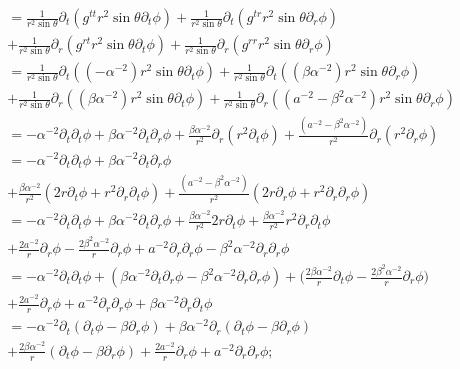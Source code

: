 \documentclass[12pt]{article}
\numberwithin{equation}{section}
\begin{document}
\begin{equation*}
\begin{aligned}
&= \frac{1}{r^2 \sin \theta} \partial_t (g^{t t} r^2 \sin \theta \partial_t \phi) + \frac{1}{r^2 \sin \theta} \partial_t (g^{t r} r^2 \sin \theta \partial_r \phi) \\
&+ \frac{1}{r^2 \sin \theta} \partial_r (g^{r t} r^2 \sin \theta \partial_t \phi) + \frac{1}{r^2 \sin \theta} \partial_r (g^{r r} r^2 \sin \theta \partial_r \phi)\\
&= \frac{1}{r^2 \sin \theta} \partial_t ( (-\alpha^{-2}) r^2 \sin \theta \partial_t \phi) + \frac{1}{r^2 \sin \theta} \partial_t ( (\beta \alpha^{-2}) r^2 \sin \theta \partial_r \phi) \\
&+ \frac{1}{r^2 \sin \theta} \partial_r ( (\beta \alpha^{-2}) r^2 \sin \theta \partial_t \phi) + \frac{1}{r^2 \sin \theta} \partial_r ( (a^{-2} - \beta^2 \alpha^{-2}) r^2 \sin \theta \partial_r \phi)\\
&= -\alpha^{-2} \partial_t \partial_t \phi + \beta \alpha^{-2} \partial_t  \partial_r \phi + \frac{\beta \alpha^{-2}}{r^2} \partial_r ( r^2 \partial_t \phi) + \frac{(a^{-2} - \beta^2 \alpha^{-2})}{r^2} \partial_r (r^2 \partial_r \phi)\\
&= -\alpha^{-2} \partial_t \partial_t \phi + \beta \alpha^{-2} \partial_t  \partial_r \phi \\
&+ \frac{\beta \alpha^{-2}}{r^2} (2 r \partial_t \phi + r^2 \partial_r \partial_t \phi) + \frac{(a^{-2} - \beta^2 \alpha^{-2})}{r^2} (2 r \partial_r \phi + r^2 \partial_r \partial_r \phi)\\
&= -\alpha^{-2} \partial_t \partial_t \phi + \beta \alpha^{-2} \partial_t  \partial_r \phi + \frac{\beta \alpha^{-2}}{r^2} 2 r \partial_t \phi + \frac{\beta \alpha^{-2}}{r^2} r^2 \partial_r \partial_t \phi \\
&+ \frac{2a^{-2}}{r} \partial_r \phi - \frac{2\beta^2 \alpha^{-2}}{r} \partial_r \phi + a^{-2} \partial_r \partial_r \phi - \beta^2 \alpha^{-2} \partial_r \partial_r \phi \\
&= -\alpha^{-2} \partial_t \partial_t \phi + (\beta \alpha^{-2} \partial_t  \partial_r \phi - \beta^2 \alpha^{-2} \partial_r \partial_r \phi) + \Big( \frac{2 \beta \alpha^{-2}}{r} \partial_t \phi - \frac{2\beta^2 \alpha^{-2}}{r} \partial_r \phi \Big) \\
&+ \frac{2a^{-2}}{r} \partial_r \phi + a^{-2} \partial_r \partial_r \phi + \beta \alpha^{-2} \partial_r \partial_t \phi \\
&= - \alpha^{-2} \partial_t (\partial_t \phi - \beta \partial_r \phi) + \beta \alpha^{-2} \partial_r (\partial_t  \phi - \beta \partial_r \phi) \\
&+ \frac{2\beta \alpha^{-2}}{r} (\partial_t \phi - \beta \partial_r \phi ) + \frac{2a^{-2}}{r} \partial_r \phi + a^{-2} \partial_r \partial_r \phi;\\
\end{aligned}
\end{equation*}
\end{document}
